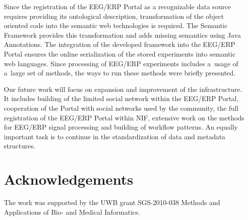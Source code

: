 \documentclass[a4paper,twoside]{article}
\begin{document}
Since the registration of the EEG/ERP Portal as a recognizable data source requires providing its ontological description, transformation of the object oriented code into the semantic web technologies is required. The Semantic Framework provides this transformation and adds missing semantics using Java Annotations. The integration of the developed framework into the EEG/ERP Portal ensures the online serialization of the stored experiments into semantic web languages. Since processing of EEG/ERP experiments includes a~usage of a~large set of methods, the ways to run these methods were briefly presented.

Our future work will focus on expansion and improvement of the infrastructure. It includes building of the limited social network within the EEG/ERP Portal, cooperation of the Portal with social networks used by the community, the full registration of the EEG/ERP Portal within NIF, extensive work on the methods for EEG/ERP signal processing and building of workflow patterns. An equally important task is to continue in the standardization of data and metadata structures.
%
\section*{Acknowledgements}
\noindent The work was supported by the UWB grant SGS-2010-038 Methods and Applications of Bio- and Medical Informatics.


{\small
}


\vfill
\end{document}
